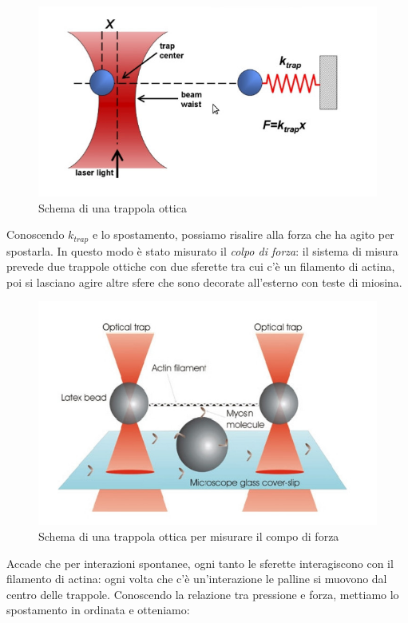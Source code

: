 \documentclass[a4paper,12pt]{article}
\begin{document}
\begin{figure}[H]
\centering
\includegraphics[scale=0.4]{immagine/trappola.jpg}
\caption{Schema di una trappola ottica} 
\end{figure}

Conoscendo $k_{trap}$ e lo spostamento, possiamo risalire alla forza che ha agito per spostarla.  In questo modo è stato misurato il \emph{colpo di forza}: il sistema di misura prevede due trappole ottiche con due sferette tra cui c'è un filamento di actina, poi si lasciano agire altre sfere che sono decorate all'esterno con teste di miosina.

\begin{figure}[H]
\centering
\includegraphics[scale=0.4]{immagine/trappola1.jpg}
\caption{Schema di una trappola ottica per misurare il compo di forza}
\end{figure}

Accade che per interazioni spontanee, ogni tanto le sferette interagiscono con il filamento di actina: ogni volta che c'è un'interazione le palline si muovono dal centro delle trappole. Conoscendo la relazione tra pressione e forza, mettiamo lo spostamento in ordinata e otteniamo:
\end{document}
